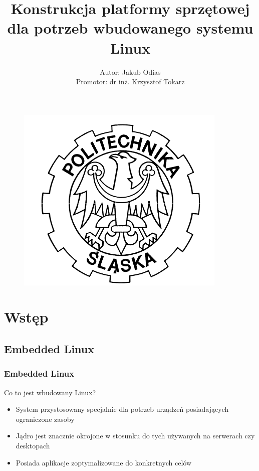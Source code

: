 \documentclass[xcolor=dvipsnames]{beamer}
\newenvironment{ramka}{\begin{frame}}
{
		\end{frame}
}
\begin{document}
	\title[Embedded Linux]{Konstrukcja platformy sprzętowej dla potrzeb wbudowanego systemu Linux}
	\author[Jakub Odias]{Autor: Jakub Odias\\\vspace{5pt}Promotor: dr inż. Krzysztof Tokarz}
	
	\begin{frame}
		\begin{figure}[b]
			\includegraphics[scale=0.15]{text/img/polsl.png} 
		\end{figure}
		\vspace{-20pt}
		\vspace{10pt}
		\titlepage
		
	\end{frame}
	
	\section{Wstęp}
	
	\subsection{Embedded Linux}
	\begin{ramka}
		\frametitle{Embedded Linux}
		\begin{block}{Co to jest wbudowany Linux?}
			\begin{itemize}
				\item<2-> System przystosowany specjalnie dla potrzeb urządzeń posiadających ograniczone zasoby
				\item<3-> Jądro jest znacznie okrojone w stosunku do tych używanych na serwerach czy desktopach
				\item<4-> Posiada aplikacje zoptymalizowane do konkretnych celów
			\end{itemize}
		\end{block}
	\end{ramka} 
	
\end{document}
